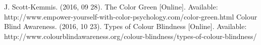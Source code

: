 \documentclass[conference]{IEEEtran}
\begin{document}
	
	\begin{thebibliography}{1}
		J. Scott-Kemmis. (2016, 09 28). The Color Green [Online]. Available: http://www.empower-yourself-with-color-psychology.com/color-green.html
		Colour Blind Awareness. (2016, 10 23). Types of Colour Blindness [Online]. Available: http://www.colourblindawareness.org/colour-blindness/types-of-colour-blindness/
	\end{thebibliography}
	
	
	
	
\end{document}
